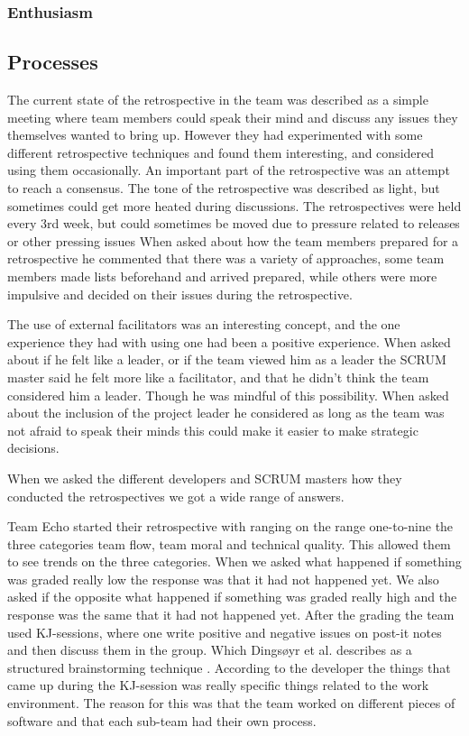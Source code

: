 \subsubsection{Enthusiasm}

\subsection{Processes}
The current state of the retrospective in the team was described as a simple meeting where team members could speak their mind and discuss any issues they themselves wanted to bring up. However they had experimented with some different retrospective techniques and found them interesting, and considered using them occasionally. An important part of the retrospective was an attempt to reach a consensus. The tone of the retrospective was described as light, but sometimes could get more heated during discussions. The retrospectives were held every 3rd week, but could sometimes be moved due to pressure related to releases or other pressing issues
When asked about how the team members prepared for a retrospective he commented that there was a variety of approaches, some team members made lists beforehand and arrived prepared, while others were more impulsive and decided on their issues during the retrospective.

The use of external facilitators was an interesting concept, and the one experience they had with using one had been a positive experience. When asked about if he felt like a leader, or if the team viewed him as a leader the SCRUM master said he felt more like a facilitator, and that he didn't think the team considered him a leader. Though he was mindful of this possibility. When asked about the inclusion of the project leader he considered as long as the team was not afraid to speak their minds this could make it easier to make strategic decisions.

\label{question-3}
When we asked the different developers and SCRUM masters how they conducted the retrospectives we got a wide range of answers. 

Team Echo started their retrospective with ranging on the range one-to-nine the three categories team flow, team moral and technical quality. This allowed them to see trends on the three categories. When we asked what happened if something was graded really low the response was that it had not happened yet. We also asked if the opposite what happened if something was graded really high and the response was the same that it had not happened yet. After the grading the team used KJ-sessions, where one write positive and negative issues on post-it notes and then discuss them in the group. Which Dingsøyr et al. describes as a structured brainstorming technique \cite{Dingsoyr2003}. According to the developer the things that came up during the KJ-session was really specific things related to the work environment. The reason for this was that the team worked on different pieces of software and that each sub-team had their own process. 

